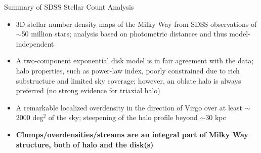 \documentclass[letterpaper,landscape]{slides}
\begin{document}

\begin{slide}

\begin{center}
\large {} Summary of SDSS Stellar Count Analysis 
\end{center}
\vskip -0.1in
\begin{itemize}
   \item 3D stellar number density maps of the Milky Way from SDSS  observations of 
         $\sim$50 million stars; analysis based on photometric distances and
         thus model-independent
   \item A two-component exponential disk model is in fair agreement with the data;
         halo properties, such as power-law index, poorly constrained due to
         rich substructure and limited sky coverage;
         however, an oblate halo is always preferred (no strong evidence for triaxial halo)
   \item A remarkable localized overdensity in the direction of Virgo over at least $\sim$2000 deg$^2$ 
         of the sky; steepening of the halo profile beyond $\sim$30 kpc
   \item {\color{red} \bf Clumps/overdensities/streams are an integral part of
         Milky Way structure, both of halo and the disk(s)}
\end{itemize}    
\vfill
\end{slide}



\end{document}
